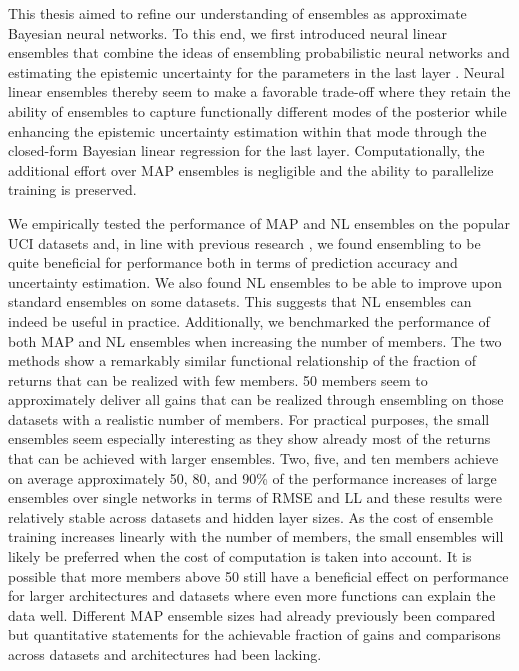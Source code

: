 \documentclass[../thesis.tex]{subfiles}
\begin{document}
This thesis aimed to refine our understanding of ensembles as approximate Bayesian neural networks. To this end, we first introduced neural linear ensembles that combine the ideas of ensembling probabilistic neural networks \parencite{lakshminarayanan2017simple} and estimating the epistemic uncertainty for the parameters in the last layer \parencite{snoek2015scalable}. Neural linear ensembles thereby seem to make a favorable trade-off where they retain the ability of ensembles to capture functionally different modes of the posterior while enhancing the epistemic uncertainty estimation within that mode through the closed-form Bayesian linear regression for the last layer. Computationally, the additional effort over MAP ensembles is negligible and the ability to parallelize training is preserved.

We empirically tested the performance of MAP and NL ensembles on the popular UCI datasets and, in line with previous research \parencite{ovadia2019can}, we found ensembling to be quite beneficial for performance both in terms of prediction accuracy and uncertainty estimation. We also found NL ensembles to be able to improve upon standard ensembles on some datasets. This suggests that NL ensembles can indeed be useful in practice. Additionally, we benchmarked the performance of both MAP and NL ensembles when increasing the number of members. The two methods show a remarkably similar functional relationship of the fraction of returns that can be realized with few members. 50 members seem to approximately deliver all gains that can be realized through ensembling on those datasets with a realistic number of members. For practical purposes, the small ensembles seem especially interesting as they show already most of the returns that can be achieved with larger ensembles. Two, five, and ten members achieve on average approximately 50, 80, and 90\% of the performance increases of large ensembles over single networks in terms of RMSE and LL and these results were relatively stable across datasets and hidden layer sizes. As the cost of ensemble training increases linearly with the number of members, the small ensembles will likely be preferred when the cost of computation is taken into account. It is possible that more members above 50 still have a beneficial effect on performance for larger architectures and datasets where even more functions can explain the data well. Different MAP ensemble sizes had already previously been compared \parencite{ovadia2019can} but quantitative statements for the achievable fraction of gains and comparisons across datasets and architectures had been lacking.
\end{document}
